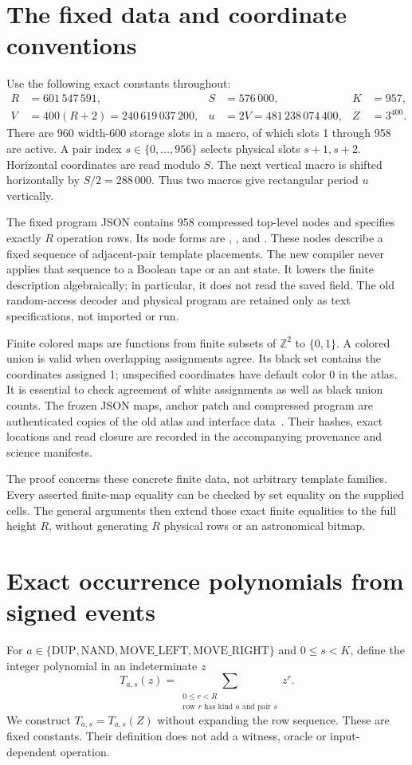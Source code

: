 \documentclass[11pt,letterpaper]{article}
\theoremstyle{definition}\newtheorem{definition}[theorem]{Definition}
\theoremstyle{remark}\newtheorem{remark}[theorem]{Remark}
\newcommand{\Z}{\mathbb Z}\newcommand{\N}{\mathbb N}\newcommand{\Zp}{\mathbb Z_{>0}}
\newcommand{\op}[1]{\mathrm{#1}}
\newcommand{\codem}[1]{\mbox{\normalfont\ttfamily\detokenize{#1}}}
\newcommand{\sDUP}{\op{DUP}}\newcommand{\sNAND}{\op{NAND}}
\newcommand{\sML}{\op{MOVE\_LEFT}}\newcommand{\sMR}{\op{MOVE\_RIGHT}}
\begin{document}
\section{The fixed data and coordinate conventions}\label{ptr:sc:sec:data}
Use the following exact constants throughout:
\begin{align*}
 R&=601\,547\,591,& S&=576\,000,& K&=957,\\
 V&=400(R+2)=240\,619\,037\,200,& u&=2V=481\,238\,074\,400,& Z&=3^{400}.
\end{align*}
There are 960 width-600 storage slots in a macro, of which slots 1 through 958 are active. A pair index $s\in\{0,\ldots,956\}$ selects physical slots $s+1,s+2$. Horizontal coordinates are read modulo $S$. The next vertical macro is shifted horizontally by $S/2=288\,000$. Thus two macros give rectangular period $u$ vertically.

The fixed program JSON contains 958 compressed top-level nodes and specifies exactly $R$ operation rows. Its node forms are \codem{RANGE}, \codem{ROW}, \codem{COPY} and \codem{GATE}. These nodes describe a fixed sequence of adjacent-pair template placements. The new compiler never applies that sequence to a Boolean tape or an ant state. It lowers the finite description algebraically; in particular, it does not read the saved \codem{prefix_rows} field. The old random-access decoder and physical program are retained only as text specifications, not imported or run.

Finite colored maps are functions from finite subsets of $\Z^2$ to $\{0,1\}$. A colored union is valid when overlapping assignments agree. Its black set contains the coordinates assigned 1; unspecified coordinates have default color 0 in the atlas. It is essential to check agreement of white assignments as well as black union counts. The frozen JSON maps, anchor patch and compressed program are authenticated copies of the old atlas and interface data~\cite{ptr:sc:report40}. Their hashes, exact locations and read closure are recorded in the accompanying provenance and science manifests.

The proof concerns these concrete finite data, not arbitrary template families. Every asserted finite-map equality can be checked by set equality on the supplied cells. The general arguments then extend those exact finite equalities to the full height $R$, without generating $R$ physical rows or an astronomical bitmap.

\section{Exact occurrence polynomials from signed events}\label{ptr:sc:sec:occurrence}
For $a\in\{\sDUP,\sNAND,\sML,\sMR\}$ and $0\le s<K$, define the integer polynomial in an indeterminate $z$
\begin{equation}\label{ptr:sc:eq:occurrence}
 T_{a,s}(z)=\sum_{\substack{0\le r<R\\\text{row }r\text{ has kind }a\text{ and pair }s}}z^r.
\end{equation}
We construct $T_{a,s}=T_{a,s}(Z)$ without expanding the row sequence. These are fixed constants. Their definition does not add a witness, oracle or input-dependent operation.
\end{document}
